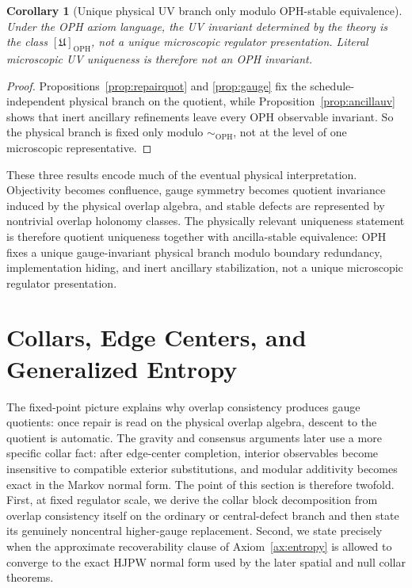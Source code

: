 \documentclass[11pt]{article}
\newtheorem{corollary}[theorem]{Corollary}
\begin{document}
\begin{corollary}[Unique physical UV branch only modulo OPH-stable equivalence]\label{cor:ophuveq}
Under the OPH axiom language, the UV invariant determined by the theory is the class \([\mathfrak U]_{\mathrm{OPH}}\), not a unique microscopic regulator presentation. Literal microscopic UV uniqueness is therefore not an OPH invariant.
\end{corollary}

\begin{proof}
Propositions~\ref{prop:repairquot} and \ref{prop:gauge} fix the schedule-independent physical
branch on the quotient, while Proposition~\ref{prop:ancillauv} shows that inert ancillary
refinements leave every OPH observable invariant. So the physical branch is fixed only modulo
\(\sim_{\mathrm{OPH}}\), not at the level of one microscopic representative.
\end{proof}

These three results encode much of the eventual physical interpretation. Objectivity becomes
confluence, gauge symmetry becomes quotient invariance induced by the physical overlap algebra, and
stable defects are represented by nontrivial overlap holonomy classes. The physically relevant
uniqueness statement is therefore quotient uniqueness together with ancilla-stable equivalence: OPH
fixes a unique gauge-invariant physical branch modulo boundary redundancy, implementation hiding,
and inert ancillary stabilization, not a unique microscopic regulator presentation.

\section{Collars, Edge Centers, and Generalized Entropy}

The fixed-point picture explains why overlap consistency produces gauge quotients: once repair is
read on the physical overlap algebra, descent to the quotient is automatic. The gravity and
consensus arguments later use a more specific collar fact: after edge-center completion, interior
observables become insensitive to compatible exterior substitutions, and modular additivity becomes
exact in the Markov normal form. The point of this section is therefore twofold. First, at fixed
regulator scale, we derive the collar block decomposition from overlap consistency itself on the
ordinary or central-defect branch and then state its genuinely noncentral higher-gauge replacement.
Second, we state precisely when the approximate recoverability clause of Axiom~\ref{ax:entropy} is
allowed to converge to the exact HJPW normal form used by the later spatial and null collar
theorems.
\end{document}
